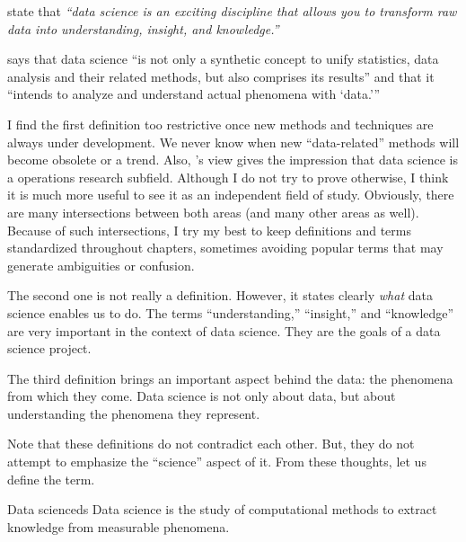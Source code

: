 \textcite{Wickham2023} state that \emph{``data science is an exciting discipline that
allows you to transform raw data into understanding, insight, and knowledge.''}


\textcite{Hayashi1998} says that data science ``is not only a
synthetic concept to unify statistics, data analysis and their related methods, but also
comprises its results'' and that it ``intends to analyze and understand actual phenomena
with `data.'{}''

I find the first definition too restrictive once new methods and techniques are always
under development.  We never know when new ``data-related'' methods will become obsolete
or a trend.  Also, \citeauthor{Zumel2019}'s view gives the impression that data science is a
operations research subfield.  Although I do not try to prove otherwise, I think it
is much more useful to see it as an independent field of study.  Obviously, there are
many intersections between both areas (and many other areas as well).  Because of such
intersections, I try my best to keep definitions and
terms standardized throughout chapters, sometimes avoiding popular terms that may generate
ambiguities or confusion.

The second one is not really a definition.  However, it states clearly \emph{what} data
science enables us to do.  The terms ``understanding,'' ``insight,'' and ``knowledge'' are
very important in the context of data science.  They are the goals of a data science
project.

The third definition brings an important aspect behind the data: the phenomena from which
they come.  Data science is not only about data, but about understanding the phenomena
they represent.

Note that these definitions do not contradict each other.  But, they do not attempt to
emphasize the ``science'' aspect of it.  From these thoughts, let us define the term.

\begin{defbox}{Data science}{ds}
  Data science is the study of computational methods to extract knowledge from
  measurable phenomena.
\end{defbox}

